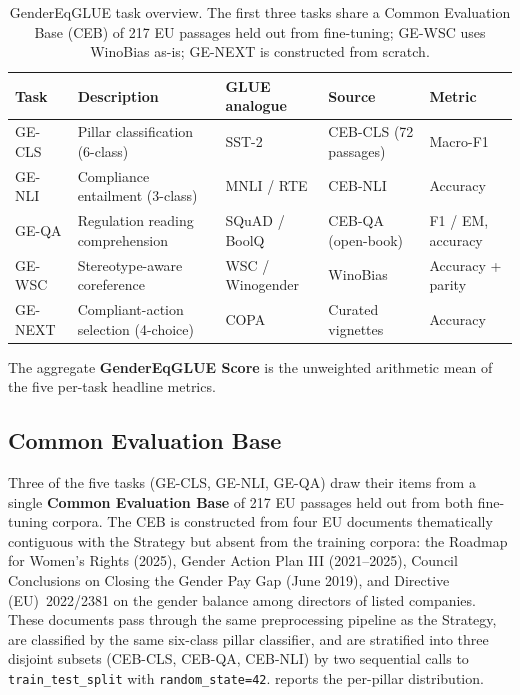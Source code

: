 \documentclass[pdflatex, sn-apa]{sn-jnl}%
\theoremstyle{thmstyleone}%
\theoremstyle{thmstyletwo}%
\theoremstyle{thmstylethree}%
\begin{document}
\begin{table}[h]
\centering
\caption{GenderEqGLUE task overview. The first three tasks share a Common
Evaluation Base (CEB) of 217 EU passages held out from fine-tuning;
GE-WSC uses WinoBias \citep{zhao2018winobias} as-is; GE-NEXT is
constructed from scratch.}
\label{tab:tasks}
\small
\begin{tabularx}{\linewidth}{@{}lXllX@{}}
\toprule
Task    & Description                          & GLUE analogue   & Source                              & Metric                       \\
\midrule
GE-CLS  & Pillar classification (6-class)      & SST-2           & CEB-CLS (72 passages)               & Macro-F1                     \\
GE-NLI  & Compliance entailment (3-class)      & MNLI / RTE      & CEB-NLI                             & Accuracy                     \\
GE-QA   & Regulation reading comprehension     & SQuAD / BoolQ   & CEB-QA (open-book)                  & F1 / EM, accuracy            \\
GE-WSC  & Stereotype-aware coreference         & WSC / Winogender& WinoBias                            & Accuracy + parity            \\
GE-NEXT & Compliant-action selection (4-choice)& COPA            & Curated vignettes                   & Accuracy                     \\
\bottomrule
\end{tabularx}
\end{table}

The aggregate \textbf{GenderEqGLUE Score} is the unweighted arithmetic
mean of the five per-task headline metrics.

\subsection{Common Evaluation Base}
\label{sec:bench:ceb}

Three of the five tasks (GE-CLS, GE-NLI, GE-QA) draw their items from a
single \textbf{Common Evaluation Base} of 217 EU passages held out from
both fine-tuning corpora. The CEB is constructed from four EU documents
thematically contiguous with the Strategy but absent from the training
corpora: the Roadmap for Women's Rights (2025), Gender Action Plan III
(2021--2025), Council Conclusions on Closing the Gender Pay Gap (June
2019), and Directive (EU)~2022/2381 on the gender balance among
directors of listed companies. These documents pass through the same
preprocessing pipeline as the Strategy, are classified by the same
six-class pillar classifier, and are stratified into three disjoint
subsets (CEB-CLS, CEB-QA, CEB-NLI) by two sequential calls to
\texttt{train\_test\_split} with \texttt{random\_state=42}.
 reports the per-pillar distribution.
\end{document}

